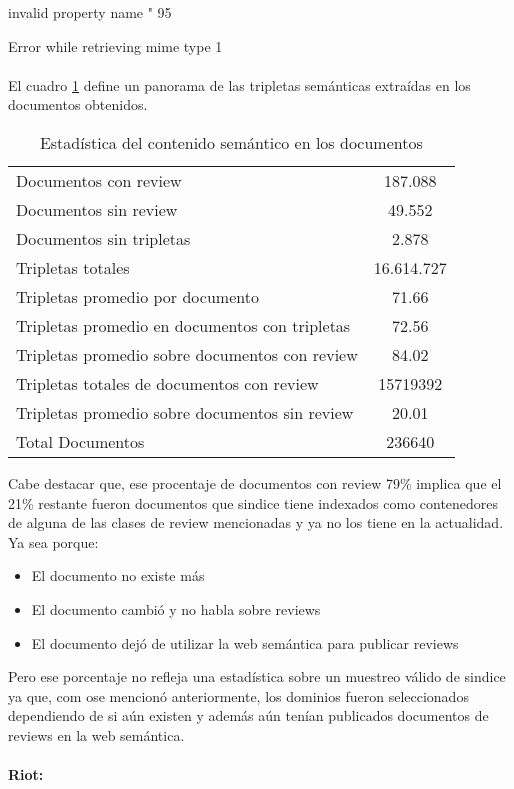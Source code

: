 \noindent invalid property name " 95

\noindent Error while retrieving mime type 1
\\ 
\\ 
El cuadro \ref{table:SemanticaEnDocumentows} define un panorama de las tripletas semánticas extraídas en los documentos obtenidos.

\begin{table}[h]
\begin{tabular}{| l | c | }\hline
Documentos con review & 187.088 \\
Documentos sin review & 49.552\\
Documentos sin tripletas & 2.878\\
Tripletas totales & 16.614.727\\
Tripletas promedio por documento & 71.66\\
Tripletas promedio en documentos con tripletas & 72.56\\
Tripletas promedio sobre documentos con review & 84.02\\
Tripletas totales de documentos con review & 15719392\\
Tripletas promedio sobre documentos sin review & 20.01\\\hline
Total Documentos & 236640\\\hline
\end{tabular}
\caption{Estadística del contenido semántico en los documentos}
\label{table:SemanticaEnDocumentows}
\end{table}

Cabe destacar que, ese procentaje de documentos con review 79\% implica que el 21\% restante fueron documentos que sindice tiene indexados como contenedores de 
alguna de las clases de review mencionadas y ya no los tiene en la actualidad. Ya sea porque:
\begin{itemize}
\item El documento no existe más
\item El documento cambió y no habla sobre reviews
\item El documento dejó de utilizar la web semántica para publicar reviews
\end{itemize}
Pero ese porcentaje no refleja una estadística sobre un muestreo válido de sindice ya que, com ose mencionó anteriormente, los dominios fueron seleccionados 
dependiendo de si aún existen y además aún tenían publicados documentos de reviews en la web semántica.
\\
\\
\textbf{Riot:}

